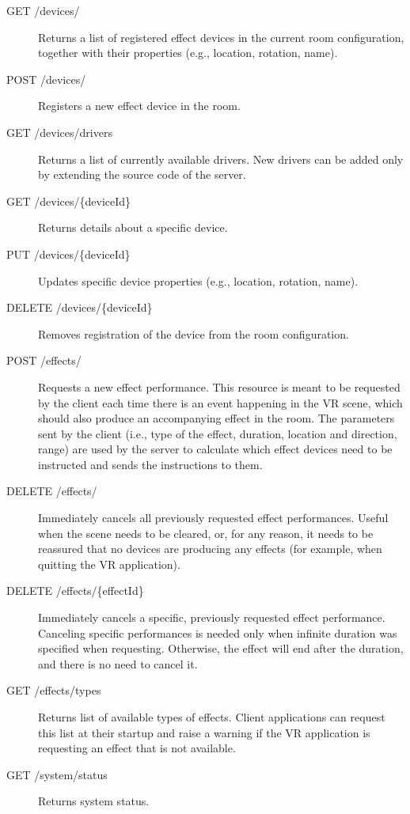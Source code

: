 \begin{description}

\item[GET /devices/]Returns a list of registered effect devices in the current room configuration,
together with their properties (e.g., location, rotation, name).

\item[POST /devices/]Registers a new effect device in the room.

\item[GET /devices/drivers]Returns a list of currently available drivers. New drivers can be added only
by extending the source code of the server.

\item[GET /devices/\{deviceId\}]Returns details about a specific device.

\item[PUT /devices/\{deviceId\}]Updates specific device properties (e.g., location, rotation, name).

\item[DELETE /devices/\{deviceId\}]Removes registration of the device from the room configuration.

\item[POST /effects/]Requests a new effect performance. This resource is meant to be requested by the
client each time there is an event happening in the VR scene, which should also
produce an accompanying effect in the room. The parameters sent by the client
(i.e., type of the effect, duration, location and direction, range) are used
by the server to calculate which effect devices need to be instructed and sends
the instructions to them.

\item[DELETE /effects/]Immediately cancels all previously requested effect performances. Useful when
the scene needs to be cleared, or, for any reason, it needs to be reassured that
no devices are producing any effects (for example, when quitting the VR
application).

\item[DELETE /effects/\{effectId\}]Immediately cancels a specific, previously requested effect performance.
Canceling specific performances is needed only when infinite duration
was specified when requesting. Otherwise, the effect will end after the
duration, and there is no need to cancel it.

\item[GET /effects/types]Returns list of available types of effects. Client applications can request
this list at their startup and raise a warning if the VR
application is requesting an effect that is not available.

\item[GET /system/status]Returns system status.

\end{description}


